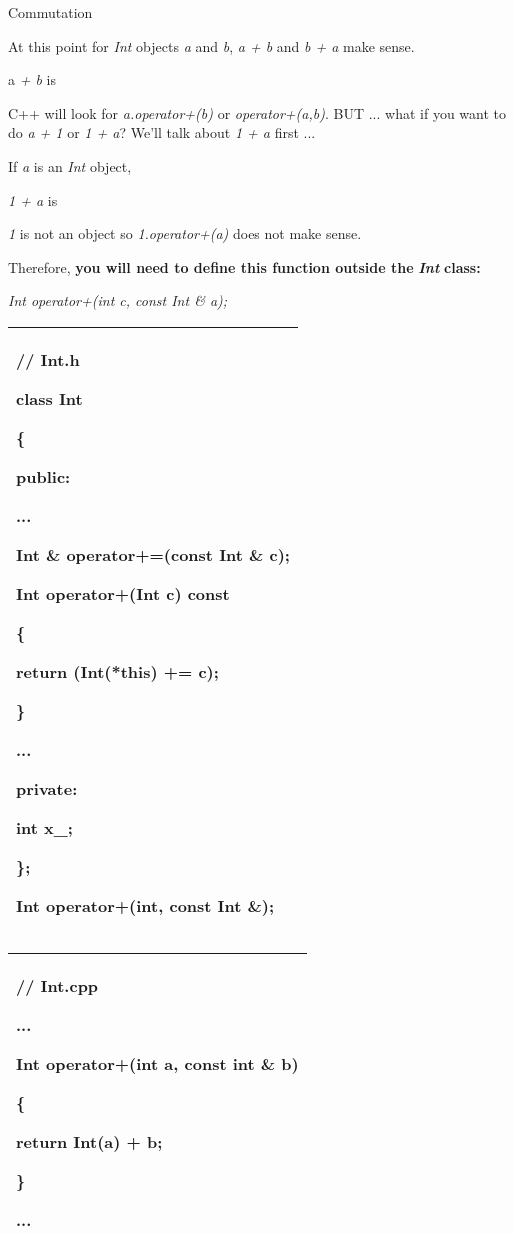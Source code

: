 \documentclass[
]{article}
\begin{document}
Commutation

At this point for \emph{Int} objects \emph{a} and \emph{b}, \emph{a + b}
and \emph{b + a} make sense.

a\emph{ + b }is

C++ will look for \emph{a.operator+(b)} or \emph{operator+(a,b)}. BUT
... what if you want to do \emph{a + 1} or \emph{1 + a}? We'll talk
about \emph{1 + a} first ...

If \emph{a} is an \emph{Int} object,

\emph{1 + a} is

\emph{1} is not an object so \emph{1.operator+(a)} does not make sense.

Therefore, \textbf{you will need to define this function outside the
}\emph{\textbf{Int}}\textbf{ class:}

\emph{Int operator+(int c, const Int \& a);}

\begin{longtable}[]{@{}l@{}}
\toprule
\endhead
\begin{minipage}[t]{0.97\columnwidth}\raggedright
// Int.h

class Int

\{

public:

...

Int \& operator+=(const Int \& c);

Int operator+(Int c) const

\{

return (Int(*this) += c);

\}

...

private:

int x\_;

\};

Int operator+(int, const Int \&);\strut
\end{minipage}\tabularnewline
\bottomrule
\end{longtable}

\begin{longtable}[]{@{}l@{}}
\toprule
\endhead
\begin{minipage}[t]{0.97\columnwidth}\raggedright
// Int.cpp

...

Int operator+(int a, const int \& b)

\{

return Int(a) + b;

\}

...\strut
\end{minipage}\tabularnewline
\bottomrule
\end{longtable}
\end{document}

